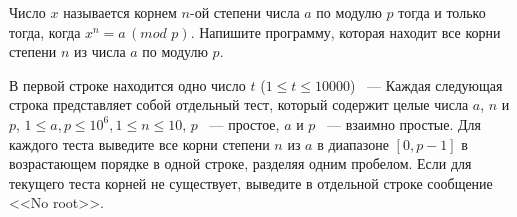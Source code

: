 Число $x$ называется корнем $n$-ой степени числа $a$ по модулю $p$
тогда и только тогда, когда $x^n = a \,(mod \,\,p)$.
Напишите программу, которая находит все корни степени $n$ из числа $a$
по модулю $p$.

\InputFile
В первой строке находится одно число $t$ ($1 \le t \le 10000$) ~---
Каждая следующая строка представляет собой отдельный тест,
который содержит целые числа $a$, $n$ и $p$,
$1 \le a, p \le 10^6, 1 \le n \le 10$,
$p$ ~--- простое, $a$ и $p$ ~--- взаимно простые.
\OutputFile
Для каждого теста выведите все корни степени $n$ из $a$ в диапазоне $[0, p-1]$
в возрастающем порядке в одной строке, разделяя одним пробелом.
Если для текущего теста корней не существует,
выведите в отдельной строке сообщение <<No root>>.
